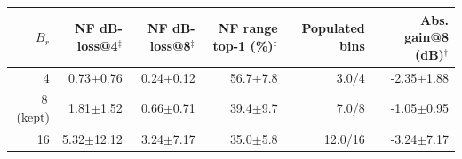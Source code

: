 \begin{tabular}{rrrrrr}
\toprule
$B_r$ & NF dB-loss@4$^\ddagger$ & NF dB-loss@8$^\ddagger$ & NF range top-1 (\%)$^\ddagger$ & Populated bins & Abs. gain@8 (dB)$^\dagger$ \\
\midrule
4 & 0.73$\pm$0.76 & 0.24$\pm$0.12 & 56.7$\pm$7.8 & 3.0/4 & -2.35$\pm$1.88 \\
8\,(kept) & 1.81$\pm$1.52 & 0.66$\pm$0.71 & 39.4$\pm$9.7 & 7.0/8 & -1.05$\pm$0.95 \\
16 & 5.32$\pm$12.12 & 3.24$\pm$7.17 & 35.0$\pm$5.8 & 12.0/16 & -3.24$\pm$7.17 \\
\bottomrule
\end{tabular}
